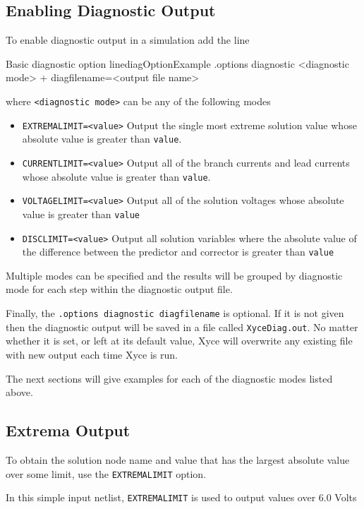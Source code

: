 \subsection{Enabling Diagnostic Output}
To enable diagnostic output in a simulation add the line
\begin{NetlistFigure}{Basic diagnostic option line}{diagOptionExample}
.options diagnostic <diagnostic mode> 
+ diagfilename=<output file name>
\end{NetlistFigure}
where \texttt{<diagnostic mode>} can be any of the following modes
\begin{itemize}
  \item \texttt{EXTREMALIMIT=<value>}  Output the single most extreme solution value 
    whose absolute value is greater than \texttt{value}.
  \item \texttt{CURRENTLIMIT=<value>}  Output all of the branch currents and lead currents  
    whose absolute value is greater than \texttt{value}.
  \item \texttt{VOLTAGELIMIT=<value>}  Output all of the solution voltages  
    whose absolute value is greater than \texttt{value}
  \item \texttt{DISCLIMIT=<value>}  Output all solution variables where the absolute value
    of the difference between the predictor and corrector is greater than \texttt{value}
\end{itemize}
Multiple modes can be specified and the results will be grouped by diagnostic mode for 
each step within the diagnostic output file.

Finally, the \texttt{.options diagnostic diagfilename} is optional.  If it is not given then 
the diagnostic output will be saved in a file called \texttt{XyceDiag.out}.  No matter whether 
it is set, or left at its default value, Xyce will overwrite any existing file with new 
output each time Xyce is run.  

The next sections will give examples for each of the diagnostic modes listed above.

\subsection{Extrema Output}
To obtain the solution node name and value that has the largest absolute value over some 
limit, use the \texttt{EXTREMALIMIT} option. 

In this simple \Xyce{} input netlist, \texttt{EXTREMALIMIT} is used to output values over 6.0 Volts

